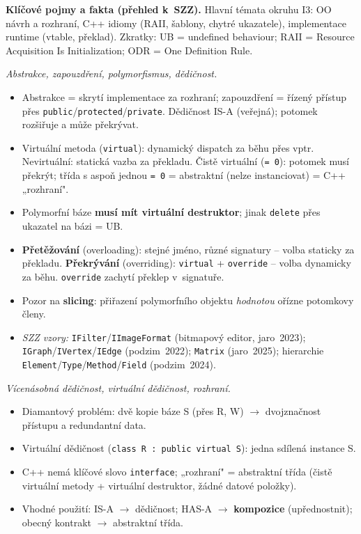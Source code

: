 \documentclass[11pt,a4paper]{article}
\newcommand{\cd}{\lstinline[style=cpp]}
\begin{document}
\begin{poznamka}
\textbf{Klíčové pojmy a fakta (přehled k~SZZ).} Hlavní témata okruhu I3: OO návrh a rozhraní, C++ idiomy (RAII, šablony, chytré ukazatele), implementace runtime (vtable, překlad). Zkratky: UB = undefined behaviour; RAII = Resource Acquisition Is Initialization; ODR = One Definition Rule.

\smallskip
\emph{Abstrakce, zapouzdření, polymorfismus, dědičnost.}
\begin{itemize}
  \item Abstrakce = skrytí implementace za rozhraní; zapouzdření = řízený přístup přes \cd{public}/\cd{protected}/\cd{private}. Dědičnost IS-A (veřejná); potomek rozšiřuje a může překrývat.
  \item Virtuální metoda (\cd{virtual}): dynamický dispatch za běhu přes vptr. Nevirtuální: statická vazba za překladu. Čistě virtuální (\cd{= 0}): potomek musí překrýt; třída s aspoň jednou \cd{= 0} = abstraktní (nelze instanciovat) = C++ „rozhraní".
  \item Polymorfní báze \textbf{musí mít virtuální destruktor}; jinak \cd{delete} přes ukazatel na bázi = UB.
  \item \textbf{Přetěžování} (overloading): stejné jméno, různé signatury -- volba staticky za překladu. \textbf{Překrývání} (overriding): \cd{virtual} + \cd{override} -- volba dynamicky za běhu. \cd{override} zachytí překlep v~signatuře.
  \item Pozor na \textbf{slicing}: přiřazení polymorfního objektu \emph{hodnotou} ořízne potomkovy členy.
  \item \emph{SZZ vzory:} \texttt{IFilter}/\texttt{IImageFormat} (bitmapový editor, jaro~2023); \texttt{IGraph}/\texttt{IVertex}/\texttt{IEdge} (podzim~2022); \texttt{Matrix} (jaro~2025); hierarchie \texttt{Element}/\texttt{Type}/\texttt{Method}/\texttt{Field} (podzim~2024).
\end{itemize}

\smallskip
\emph{Vícenásobná dědičnost, virtuální dědičnost, rozhraní.}
\begin{itemize}
  \item Diamantový problém: dvě kopie báze S (přes R, W) $\to$ dvojznačnost přístupu a redundantní data.
  \item Virtuální dědičnost (\texttt{class R : public virtual S}): jedna sdílená instance S.
  \item C++ nemá klíčové slovo \texttt{interface}; „rozhraní" = abstraktní třída (čistě virtuální metody + virtuální destruktor, žádné datové položky).
  \item Vhodné použití: IS-A $\to$ dědičnost; HAS-A $\to$ \textbf{kompozice} (upřednostnit); obecný kontrakt $\to$ abstraktní třída.
\end{itemize}


\end{poznamka}
\end{document}

